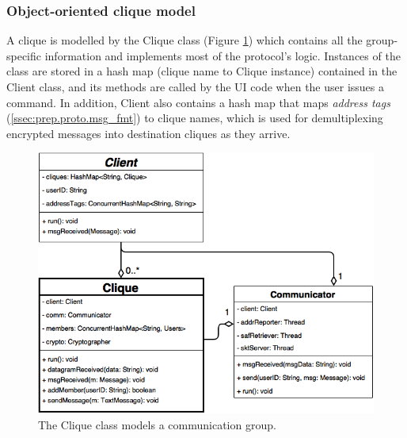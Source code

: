 \documentclass[a4paper, 12pt]{report}
\begin{document}
\subsubsection{Object-oriented clique model}
A clique is modelled by the Clique class (Figure \ref{fig:clique_uml}) which contains all the group-specific information and implements most of the protocol's logic. Instances of the class are stored in a hash map (clique name to Clique instance) contained in the Client class, and its methods are called by the UI code when the user issues a command. In addition, Client also contains a hash map that maps \emph{address tags} (\cref{ssec:prep.proto.msg_fmt}) to clique names, which is used for demultiplexing encrypted messages into destination cliques as they arrive.
\begin{figure}[H]
    \centering
    \includegraphics[width=0.8\linewidth]{pics/clique_uml.png}
    \caption{\label{fig:clique_uml} The Clique class models a communication group.}
\end{figure}
\end{document}

